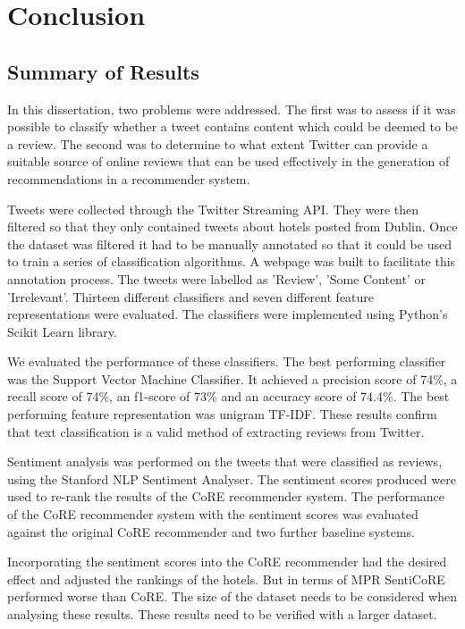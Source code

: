 \section{Conclusion}

\subsection{Summary of Results}

In this dissertation, two problems were addressed. The first was to assess if it was possible to classify whether a tweet contains content which could be deemed to be a review. The second was to determine to what extent Twitter can provide a suitable source of online reviews that can be used effectively in the generation of recommendations in a recommender system.

Tweets were collected through the Twitter Streaming API. They were then filtered so that they only contained tweets about hotels posted from Dublin. Once the dataset was filtered it had to be manually annotated so that it could be used to train a series of classification algorithms. A webpage was built to facilitate this annotation process. The tweets were labelled as 'Review', 'Some Content' or 'Irrelevant'. Thirteen different classifiers and seven different feature representations were evaluated. The classifiers were implemented using Python's Scikit Learn library.

We evaluated the performance of these classifiers. The best performing classifier was the Support Vector Machine Classifier. It achieved a precision score of 74\%, a recall score of 74\%, an f1-score of 73\% and an accuracy score of 74.4\%. The best performing feature representation was unigram TF-IDF. These results confirm that text classification is a valid method of extracting reviews from Twitter. 

Sentiment analysis was performed on the tweets that were classified as reviews, using the Stanford NLP Sentiment Analyser. The sentiment scores produced were used to re-rank the results of the CoRE recommender system. The performance of the CoRE recommender system with the sentiment scores was evaluated against the original CoRE recommender and two further baseline systems.

Incorporating the sentiment scores into the CoRE recommender had the desired effect and adjusted the rankings of the hotels. But in terms of MPR SentiCoRE performed worse than CoRE. The size of the dataset needs to be considered when analysing these results. These results need to be verified with a larger dataset.

